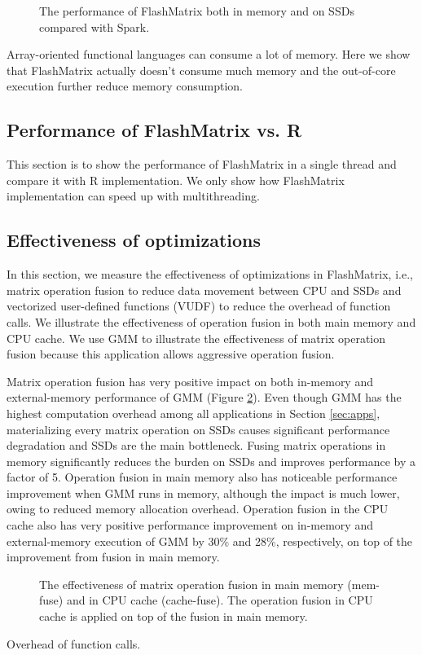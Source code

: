 \begin{figure}
	\begin{center}
		\footnotesize
		
		\caption{The performance of FlashMatrix both in memory and on SSDs
		compared with Spark.}
		\label{perf:fm}
	\end{center}
\end{figure}

Array-oriented functional languages can consume a lot of memory. Here we show
that FlashMatrix actually doesn't consume much memory and the out-of-core
execution further reduce memory consumption.

\subsection{Performance of FlashMatrix vs. R}
This section is to show the performance of FlashMatrix in a single thread
and compare it with R implementation. We only show how FlashMatrix implementation
can speed up with multithreading.

\subsection{Effectiveness of optimizations}

In this section, we measure the effectiveness of optimizations in FlashMatrix,
i.e., matrix operation fusion to reduce data movement between CPU and SSDs and
vectorized user-defined functions (VUDF) to reduce the overhead of function
calls. We illustrate the effectiveness of operation fusion in both main memory
and CPU cache. We use GMM to illustrate the effectiveness of matrix
operation fusion because this application allows aggressive operation fusion.

Matrix operation fusion has very positive impact on both in-memory and
external-memory performance of GMM (Figure \ref{perf:mem_move}). Even though
GMM has the highest computation overhead among all applications in Section
\ref{sec:apps}, materializing every matrix operation on SSDs causes significant
performance degradation and SSDs are the main bottleneck. Fusing matrix
operations in memory significantly reduces the burden on SSDs and improves
performance by a factor of 5. Operation fusion in main memory also has noticeable
performance improvement when GMM runs in memory, although the impact is much
lower, owing to reduced memory allocation overhead. Operation fusion in
the CPU cache also has very positive performance improvement on in-memory
and external-memory execution of GMM by 30\% and 28\%, respectively, on top of
the improvement from fusion in main memory.

\begin{figure}
	\begin{center}
		\footnotesize
		
		\caption{The effectiveness of matrix operation fusion in main memory
			(mem-fuse) and in CPU cache (cache-fuse). The operation fusion in
		CPU cache is applied on top of the fusion in main memory.}
		\label{perf:mem_move}
	\end{center}
\end{figure}

Overhead of function calls.
